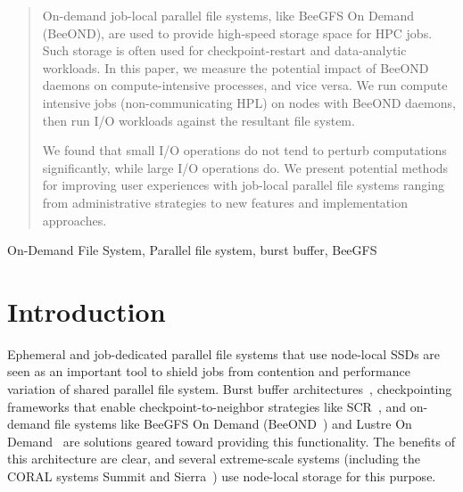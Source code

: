\documentclass[conference]{IEEEtran}
\begin{document}




\maketitle

\begin{abstract}
On-demand job-local parallel file systems, like BeeGFS On Demand
(BeeOND), are used to provide high-speed storage space for HPC
jobs. Such storage is often used for checkpoint-restart and
data-analytic workloads. In this paper, we measure the potential
impact of BeeOND daemons on compute-intensive processes, and vice
versa. We run compute intensive jobs (non-communicating HPL) on nodes with
BeeOND daemons, then run I/O workloads against the resultant file system.

We found that small I/O operations do not tend to perturb computations
significantly, while large I/O operations do. We present potential
methods for improving user experiences with job-local parallel file
systems ranging from administrative strategies to new features and
implementation approaches.
\end{abstract}

\begin{IEEEkeywords}
On-Demand File System, Parallel file system, burst buffer, BeeGFS
\end{IEEEkeywords}



%
\IEEEpeerreviewmaketitle



\section{Introduction}

Ephemeral and job-dedicated parallel file systems that use node-local
SSDs are seen as an important tool to shield jobs from contention and
performance variation of shared parallel file system. Burst buffer
architectures~\cite{MSST:burstbuffer, SC15:burstfs}, checkpointing
frameworks that enable checkpoint-to-neighbor strategies like
SCR~\cite{scr}, and on-demand file systems like BeeGFS On Demand (BeeOND~\cite{beeond})
and Lustre On Demand~\cite{lustre-on-demand} are solutions geared
toward providing this functionality. The benefits of this architecture
are clear, and several extreme-scale systems (including
the CORAL systems Summit and Sierra~\cite{coral-node-local}) use node-local
storage for this purpose.
\end{document}
